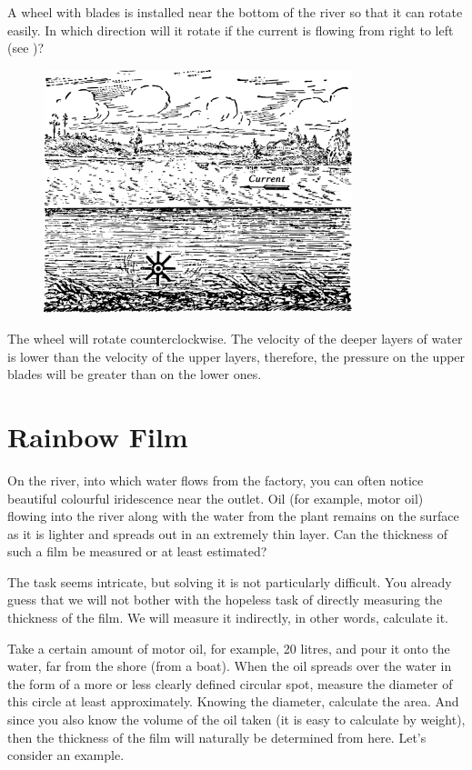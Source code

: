 \ques A wheel with blades is installed near the bottom of the river so that it can rotate easily. In which direction will it rotate if the current is flowing from right to left (see )?

\begin{figure}[h!]
\centering
\includegraphics[width=0.8\textwidth]{figures/ch-02/fig-045.pdf}
\end{figure}

\ans The wheel will rotate counterclockwise. The velocity of the deeper layers of water is lower than the velocity of the upper layers, therefore, the pressure on the upper blades will be greater than on the lower ones.


\section{Rainbow Film}
\label{sec-2.10}
On the river, into which water flows from the factory, you can often notice beautiful colourful iridescence near the outlet. Oil (for example, motor oil) flowing into the river along with the water from the plant remains on the surface as it is lighter and spreads out in an extremely thin layer. Can the thickness of such a film be measured or at least estimated?

The task seems intricate, but solving it is not particularly difficult. You already guess that we will not bother with the hopeless task of directly measuring the thickness of the film. We will measure it indirectly, in other words, calculate it.

Take a certain amount of motor oil, for example, 20 litres, and pour it onto the water, far from the shore (from a boat). When the oil spreads over the water in the form of a more or less clearly defined circular spot, measure the diameter of this circle at least approximately. Knowing the diameter, calculate the area. And since you also know the volume of the oil taken (it is easy to calculate by weight), then the thickness of the film will naturally be determined from here. Let's consider an example.


